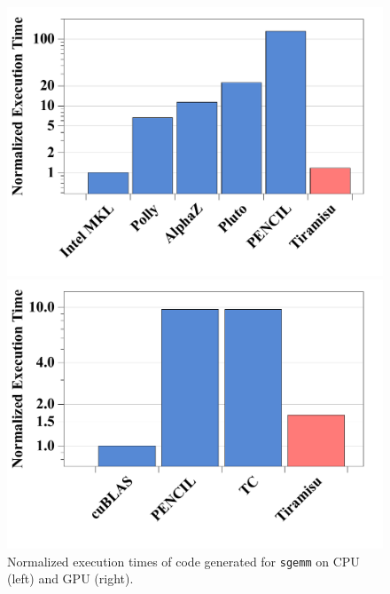 \begin{figure}[t]
\centering
  \begin{minipage}{0.22\textwidth}
    \includegraphics[width=\columnwidth]{./figures/sgemm_performance_CPU.pdf}
  \end{minipage}
  \begin{minipage}{0.22\textwidth}
    \includegraphics[width=\columnwidth]{./figures/sgemm_performance_GPU.pdf}
  \end{minipage}
  \vspace{-0.5cm}
  \caption{Normalized execution times of code generated for \texttt{sgemm} on CPU (left) and GPU (right).}
  \label{gemm-cpu-gpu}
  \vspace{-0.5cm}
\end{figure}

